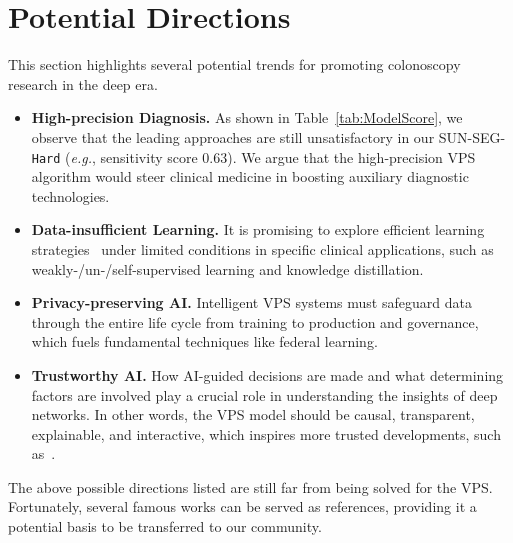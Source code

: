 \documentclass[default,iicol]{sn-jnl}
\theoremstyle{thmstyleone}
\theoremstyle{thmstyletwo}
\theoremstyle{thmstylethree}
\newcommand{\tabref}[1]{Table~\ref{#1}}
\def\eg{\emph{e.g.}}
\def\ourdataset{SUN-SEG}
\begin{document}
\section{Potential Directions}\label{sec:future_trends}
This section highlights several potential trends for promoting colonoscopy research in the deep era.
\begin{itemize}
    \item \textbf{High-precision Diagnosis.} 
    As shown in \tabref{tab:ModelScore}, we observe that the leading approaches are still unsatisfactory in our \ourdataset-\texttt{Hard} (\eg, sensitivity score  0.63).
We argue that the high-precision VPS algorithm would steer clinical medicine in boosting auxiliary diagnostic technologies.
    
    \item \textbf{Data-insufficient Learning.} 
    It is promising to explore efficient learning strategies~\cite{guo2021semantic,senkyire2021supervised} under limited conditions in specific clinical applications, such as weakly-/un-/self-supervised learning and knowledge distillation.
    
    \item \textbf{Privacy-preserving AI.} 
    Intelligent VPS systems must safeguard data through the entire life cycle from training to production and governance, which fuels fundamental techniques like federal learning.
    
    \item \textbf{Trustworthy AI.} 
    How AI-guided decisions are made and what determining factors are involved play a crucial role in understanding the insights of deep networks.
In other words, the VPS model should be causal, transparent, explainable, and interactive, which inspires more trusted developments, such as~\cite{zou2022tbrats}.
\end{itemize}

The above possible directions listed are still far from being solved for the VPS.
Fortunately, several famous works can be served as references, providing it a potential basis to be transferred to our community.
\end{document}
